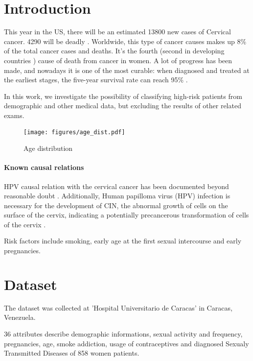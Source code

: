 \section{Introduction}

This year in the US, there will be an estimated 13800 new cases of Cervical cancer. 4290 will be deadly \cite{acs}.
Worldwide, this type of cancer causes makes up 8\% of the total cancer cases and deaths. It's the fourth (second in developing countries \cite{Catarino2015}) cause of death from cancer in women.
A lot of progress has been made, and nowadays it is one of the most curable: when diagnosed and treated at the earliest stages, the five-year survival rate can reach 95\% \cite{cruk}.

In this work, we investigate the possibility of classifying high-risk patients from demographic and other medical data, but excluding the results of other related exams.

\begin{figure}
    \centerline{
        \texttt{[image: figures/age\_dist.pdf]}}
    \caption{Age distribution}
    \label{age_distribution}
\end{figure}
\paragraph{Known causal relations}

HPV causal relation with the cervical cancer has been documented beyond reasonable doubt \cite{Bosch2002}. Additionally, Human papilloma virus (HPV) infection is necessary for the development of CIN, the abnormal growth of cells on the surface of the cervix, indicating a potentially precancerous transformation of cells of the cervix \cite{kumar2017robbins}.

Risk factors include smoking, \cite{Collins2010} early age at the first sexual intercourse and early pregnancies.

\section{Dataset}

The dataset was collected at 'Hospital Universitario de Caracas' in Caracas, Venezuela.

36 attributes describe demographic informations, sexual activity and frequency, pregnancies, age, smoke addiction, usage of contraceptives and diagnosed Sexualy Transmitted Diseases of 858 women patients.

